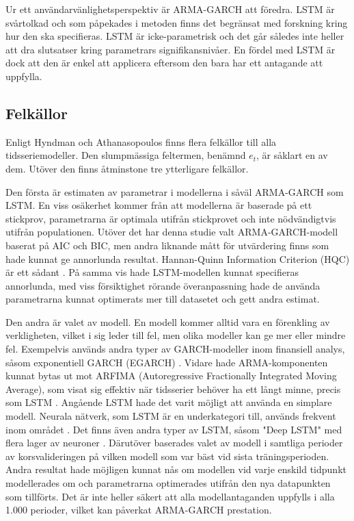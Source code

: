 \documentclass[11pt]{article}
\numberwithin{equation}{section}
\numberwithin{table}{section}
\numberwithin{figure}{section}
\begin{document}
Ur ett användarvänlighetsperspektiv är ARMA-GARCH att föredra. LSTM är svårtolkad och som påpekades i metoden finns det begränsat med forskning kring hur den ska specifieras. LSTM är icke-parametrisk och det går således inte heller att dra slutsatser kring parametrars signifikansnivåer. En fördel med LSTM är dock att den är enkel att applicera eftersom den bara har ett antagande att uppfylla. 

\subsection{Felkällor}
Enligt Hyndman och Athanasopoulos \parencite*[][,s.452 f.]{hyndman2018forecasting} finns flera felkällor till alla tidsseriemodeller. Den slumpmässiga feltermen, benämnd \(e_t\), är såklart en av dem. Utöver den finns åtminstone tre ytterligare felkällor. 

Den första är estimaten av parametrar i modellerna i såväl ARMA-GARCH som LSTM. En viss osäkerhet kommer från att modellerna är baserade på ett stickprov, parametrarna är optimala utifrån stickprovet och inte nödvändigtvis utifrån populationen. Utöver det har denna studie valt ARMA-GARCH-modell baserat på AIC och BIC, men andra liknande mått för utvärdering finns som hade kunnat ge annorlunda resultat. Hannan-Quinn Information Criterion (HQC) är ett sådant \parencite{hannan1979determination}. På samma vis hade LSTM-modellen kunnat specifieras annorlunda, med viss försiktighet rörande överanpassning hade de använda parametrarna kunnat optimerats mer till datasetet och gett andra estimat.

Den andra är valet av modell. En modell kommer alltid vara en förenkling av verkligheten, vilket i sig leder till fel, men olika modeller kan ge mer eller mindre fel. Exempelvis används andra typer av GARCH-modeller inom finansiell analys, såsom exponentiell GARCH (EGARCH) \parencite{nelson1991conditional}. Vidare hade ARMA-komponenten kunnat bytas ut mot ARFIMA (Autoregressive Fractionally Integrated Moving Average), som visat sig effektiv när tidsserier behöver ha ett långt minne, precis som LSTM \parencite{taqqu1995estimators}. Angående LSTM hade det varit möjligt att använda en simplare modell. Neurala nätverk, som LSTM är en underkategori till, används frekvent inom området \parencite[se t.ex.][]{rather2015recurrent}. Det finns även andra typer av LSTM, såsom "Deep LSTM" med flera lager av neuroner \parencite[se applikation i][]{hansson2017stock}. Därutöver baserades valet av modell i samtliga perioder av korsvalideringen på vilken modell som var bäst vid sista träningsperioden. Andra resultat hade möjligen kunnat nås om modellen vid varje enskild tidpunkt modellerades om och parametrarna optimerades utifrån den nya datapunkten som tillförts. Det är inte heller säkert att alla modellantaganden uppfylls i alla 1.000 perioder, vilket kan påverkat ARMA-GARCH prestation. 
\end{document}
